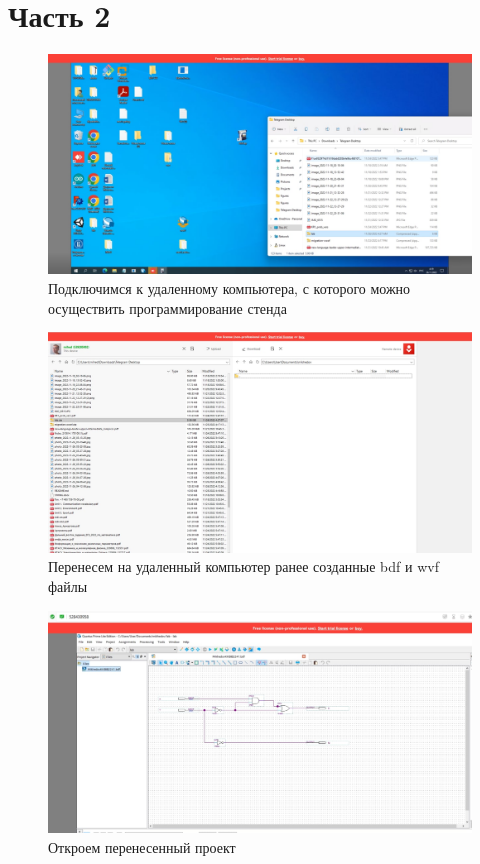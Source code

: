 \documentclass[a4paper,12pt]{article}
\begin{document}
  \section{Часть 2}

  \begin{figure}[H]
    \centering
    \includegraphics[width=12cm]{01_19}
    \caption{Подключимся к удаленному компьютера, с которого можно осуществить программирование стенда}
  \end{figure}

  \begin{figure}[H]
    \centering
    \includegraphics[width=12cm]{01_20}
    \caption{Перенесем на удаленный компьютер ранее созданные bdf и wvf файлы}
  \end{figure}

  \begin{figure}[H]
    \centering
    \includegraphics[width=12cm]{01_21}
    \caption{Откроем перенесенный проект}
  \end{figure}
\end{document}
